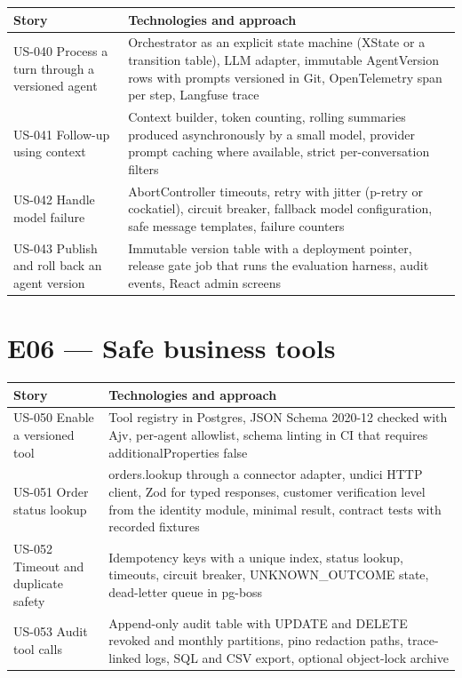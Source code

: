 {\small
\begin{longtable}{@{}>{\raggedright\arraybackslash}p{}>{\raggedright\arraybackslash}p{}@{}}
\toprule
\textbf{Story} & \textbf{Technologies and approach} \\
\midrule
\endhead
\bottomrule
\endfoot
US-040 Process a turn through a versioned agent & Orchestrator as an explicit state machine (XState or a transition table), LLM adapter, immutable AgentVersion rows with prompts versioned in Git, OpenTelemetry span per step, Langfuse trace \\
US-041 Follow-up using context & Context builder, token counting, rolling summaries produced asynchronously by a small model, provider prompt caching where available, strict per-conversation filters \\
US-042 Handle model failure & AbortController timeouts, retry with jitter (p-retry or cockatiel), circuit breaker, fallback model configuration, safe message templates, failure counters \\
US-043 Publish and roll back an agent version & Immutable version table with a deployment pointer, release gate job that runs the evaluation harness, audit events, React admin screens \\
\end{longtable}
}

\section{E06 --- Safe business tools}

{\small
\begin{longtable}{@{}>{\raggedright\arraybackslash}p{}>{\raggedright\arraybackslash}p{}@{}}
\toprule
\textbf{Story} & \textbf{Technologies and approach} \\
\midrule
\endhead
\bottomrule
\endfoot
US-050 Enable a versioned tool & Tool registry in Postgres, JSON Schema 2020-12 checked with Ajv, per-agent allowlist, schema linting in CI that requires additionalProperties false \\
US-051 Order status lookup & orders.lookup through a connector adapter, undici HTTP client, Zod for typed responses, customer verification level from the identity module, minimal result, contract tests with recorded fixtures \\
US-052 Timeout and duplicate safety & Idempotency keys with a unique index, status lookup, timeouts, circuit breaker, UNKNOWN\_OUTCOME state, dead-letter queue in pg-boss \\
US-053 Audit tool calls & Append-only audit table with UPDATE and DELETE revoked and monthly partitions, pino redaction paths, trace-linked logs, SQL and CSV export, optional object-lock archive \\
\end{longtable}
}

